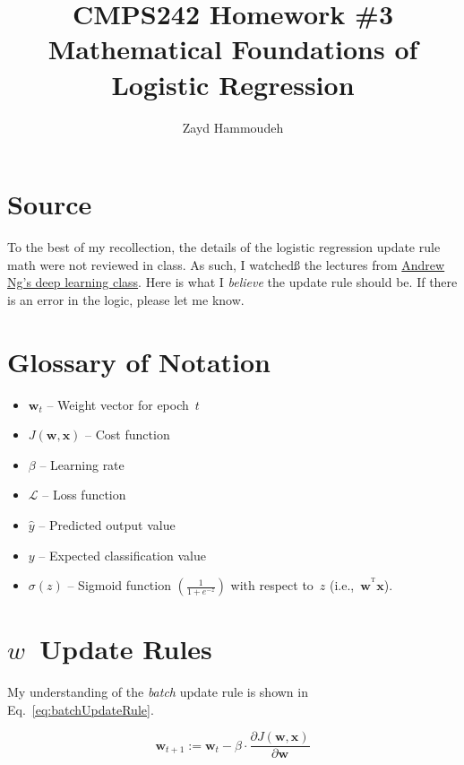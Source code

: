 \documentclass{report}
\title{\textbf{CMPS242 Homework \#3 \textendash{} Mathematical Foundations of Logistic Regression}}
\author{Zayd Hammoudeh}
\newcommand{\T}{^\textrm{T}}
\begin{document}

  \section{Source}
  
  To the best of my recollection, the details of the logistic regression update rule math were not reviewed in class.  As such, I watchedß the lectures from \href{https://www.coursera.org/learn/neural-networks-deep-learning/home/week/2}{\color{purple} Andrew Ng's deep learning class}.  Here is what I \textit{believe} the update rule should be.  If there is an error in the logic, please let me know.
  
  \section{Glossary of Notation}
  
  \begin{itemize}
    \item $\mathbf{w}_{t}$ -- Weight vector for epoch~$t$
    \item $J(\mathbf{w},\mathbf{x})$ -- Cost function
    \item $\beta$ -- Learning rate
    \item $\mathcal{L}$ -- Loss function
    \item $\hat{y}$ -- Predicted output value
    \item $y$ -- Expected classification value
    \item $\sigma(z)$ -- Sigmoid function ${\left(\frac{1}{1+e^{-z}}\right)}$ with respect to~$z$ (i.e.,~${\mathbf{w}^{\T} \mathbf{x}}$).
  \end{itemize}
  
  \section{$w$~Update Rules}
  
  My understanding of the \textit{batch} update rule is shown in Eq.~\eqref{eq:batchUpdateRule}.
  
  \begin{equation}
    \mathbf{w}_{t+1} := \mathbf{w}_{t} - \beta \cdot \frac{\partial J(\mathbf{w}, \mathbf{x})}{\partial \mathbf{w}}
    \label{eq:batchUpdateRule}
  \end{equation}
  
\end{document}
